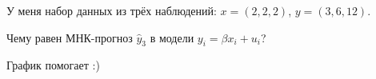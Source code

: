 
\begin{question}
У меня набор данных из трёх наблюдений: \(x = (2, 2, 2)\), \(y = (3, 6, 12)\).

Чему равен МНК-прогноз \(\hat y_3\) в модели \(y_i = \beta x_i + u_i\)?
\end{question}

\begin{solution}
График помогает :)
\end{solution}

